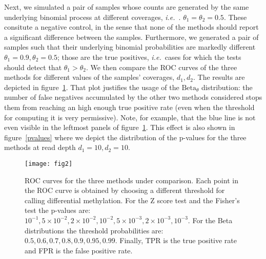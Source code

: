 \documentclass[11pt]{amsart}
\newcommand{\ie}{\textit{i.e.}\ }
\newcommand{\betapdf}{\mbox{Beta}_\theta}
\newcommand{\e}[1]{\times 10^{#1}}
\begin{document}
Next, we simulated a pair of samples whose counts are generated by the same underlying binomial process at different coverages, \ie. $\theta_1=\theta_2=0.5$. These consitute a negative control, in the sense that none of the  methods should report a significant difference between the samples. Furthermore, we generated a pair of samples such that their underlying binomial probabilities are markedly different $\theta_1=0.9,\theta_2=0.5$; those are the true positives, \ie cases for which the tests should detect that $\theta_1>\theta_2$. We then compare the ROC curves of the three methods for different values of the samples' coverages, $d_1,d_2$. 
The results are depicted in figure~\ref{roc}. That plot justifies the usage of the $\betapdf$ distribution: the number of false negatives accumulated by the other two methods considered stops them from reaching an high enough true positive rate (even when the threshold for computing it is very permissive). Note, for example, that the blue line is not even visible in the leftmost panels of figure~\ref{roc}. This effect is also shown in figure~\ref{pvalues} where we depict the distribution of the p-values for the three methods at read depth $d_1=10,d_2=10$. 

\begin{figure}[h]
\caption{ROC curves for the three methods under comparison. Each point in the ROC curve is obtained by choosing a different threshold for calling differential methylation. For the Z score test and the Fisher's test the p-values are: $10^{-1}, 5\e{-2}, 2\e{-2}, 10^{-2}, 5\e{-3}, 2\e{-3}, 10^{-3}$. For the Beta distributions the threshold probabilities are: $0.5, 0.6, 0.7, 0.8, 0.9, 0.95, 0.99$. Finally, TPR is the true positive rate and FPR is the false positive rate.}
\texttt{[image: fig2]}
\label{roc}
\end{figure}
\end{document}
